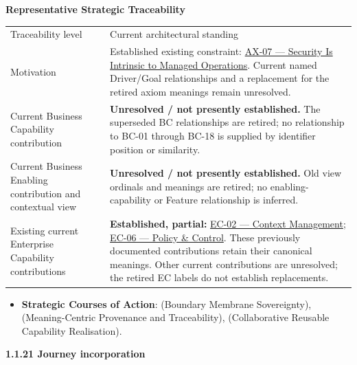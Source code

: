 \par\medskip\textbf{Representative Strategic Traceability}\par


\begin{longtable}{>{\raggedright\arraybackslash}p{}>{\raggedright\arraybackslash}p{}}
Traceability level & Current architectural standing \\
Motivation & Established existing constraint: \hyperref[element:5de2ae2c3b794c2d9f3a14efd51d564f]{AX-07 — Security Is Intrinsic to Managed Operations}. Current named Driver/Goal relationships and a replacement for the retired axiom meanings remain unresolved. \\
Current Business Capability contribution & \textbf{Unresolved / not presently established.} The superseded BC relationships are retired; no relationship to BC-01 through BC-18 is supplied by identifier position or similarity. \\
Current Business Enabling contribution and contextual view & \textbf{Unresolved / not presently established.} Old view ordinals and meanings are retired; no enabling-capability or Feature relationship is inferred. \\
Existing current Enterprise Capability contributions & \textbf{Established, partial:} \href{\detokenize{../../../../../../../../docs/markdown/02-strategy/capabilities/enterprise-capabilities.md#ec-02-context-management}}{EC-02 — Context Management}; \href{\detokenize{../../../../../../../../docs/markdown/02-strategy/capabilities/enterprise-capabilities.md#ec-06-policy--control}}{EC-06 — Policy \& Control}. These previously documented contributions retain their canonical meanings. Other current contributions are unresolved; the retired EC labels do not establish replacements. \\
\end{longtable}


\begin{itemize}


\item \textbf{Strategic Courses of Action}: \texttt{} (Boundary Membrane Sovereignty), \texttt{} (Meaning-Centric Provenance and Traceability), \texttt{} (Collaborative Reusable Capability Realisation).

\end{itemize}


\par\medskip\textbf{1.1.21 Journey incorporation}\par


